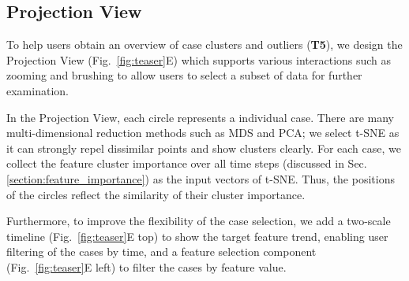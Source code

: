 \subsection{Projection View}
To help users obtain an overview of case clusters and outliers (\textbf{T5}), we design the Projection View (Fig.~\ref{fig:teaser}E) which supports various interactions such as zooming and brushing to allow users to select a subset of data for further examination.

In the Projection View, each circle represents a individual case. There are many multi-dimensional reduction methods such as MDS and PCA; we select t-SNE as it can strongly repel dissimilar points and show clusters clearly.
For each case, we collect the feature cluster importance over all time steps (discussed in Sec.\ref{section:feature_importance}) as the input vectors of t-SNE.
Thus, the positions of the circles reflect the similarity of their cluster importance.



Furthermore, to improve the flexibility of the case selection, we add a two-scale timeline (Fig.~\ref{fig:teaser}E top) to show the target feature trend, enabling user filtering of the cases by time, and a feature selection component (Fig.~\ref{fig:teaser}E left) to filter the cases by feature value.  

